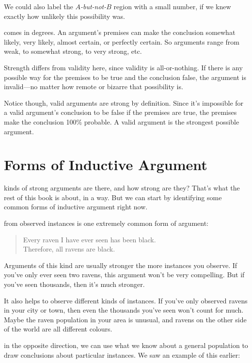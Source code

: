 \documentclass[justified]{tufte-book}
\newenvironment{argument}{\begin{quote}\normalsize}{\end{quote}}
\begin{document}
We could also label the \emph{\(A\)-but-not-\(B\)} region with a small number, if we knew exactly how unlikely this possibility was.

 comes in degrees. An argument's premises can make the conclusion somewhat likely, very likely, almost certain, or perfectly certain. So arguments range from weak, to somewhat strong, to very strong, etc.

Strength differs from validity here, since validity is all-or-nothing. If there is any possible way for the premises to be true and the conclusion false, the argument is invalid---no matter how remote or bizarre that possibility is.

Notice though, valid arguments are strong by definition. Since it's impossible for a valid argument's conclusion to be false if the premises are true, the premises make the conclusion 100\% probable. A valid argument is the strongest possible argument.

\hypertarget{indargs}{%
\section{Forms of Inductive Argument}\label{indargs}}

 kinds of strong arguments are there, and how strong are they? That's what the rest of this book is about, in a way. But we can start by identifying some common forms of inductive argument right now.

 from observed instances is one extremely common form of argument:

\begin{argument}
Every raven I have ever seen has been black.\\
Therefore, all ravens are black.
\end{argument}

Arguments of this kind are usually stronger the more instances you observe. If you've only ever seen two ravens, this argument won't be very compelling. But if you've seen thousands, then it's much stronger.

It also helps to observe different kinds of instances. If you've only observed ravens in your city or town, then even the thousands you've seen won't count for much. Maybe the raven population in your area is unusual, and ravens on the other side of the world are all different colours.

 in the opposite direction, we can use what we know about a general population to draw conclusions about particular instances. We saw an example of this earlier:
\end{document}
